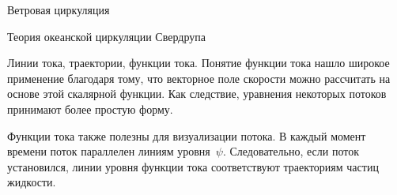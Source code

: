 \begin{chapter}{Ветровая циркуляция}
\begin{section}{Теория океанской циркуляции Свердрупа}
\begin{paragraph}{Линии тока, траектории, функции тока.}
Понятие функции тока нашло широкое применение благодаря тому, что 
векторное поле скорости можно рассчитать на основе этой скалярной функции. 
Как следствие, уравнения некоторых потоков принимают более простую форму.
%

Функции тока также полезны для визуализации потока. В каждый момент времени
поток параллелен линиям уровня~$\psi$. Следовательно, если поток 
установился, линии уровня функции тока соответствуют траекториям частиц 
жидкости.
%


\end{paragraph}
\end{section}
\end{chapter}
